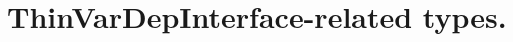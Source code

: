 \hypertarget{group___thin_var_dep_interface___t_y_p_e_s}{}\section{Thin\+Var\+Dep\+Interface-\/related types.}
\label{group___thin_var_dep_interface___t_y_p_e_s}
